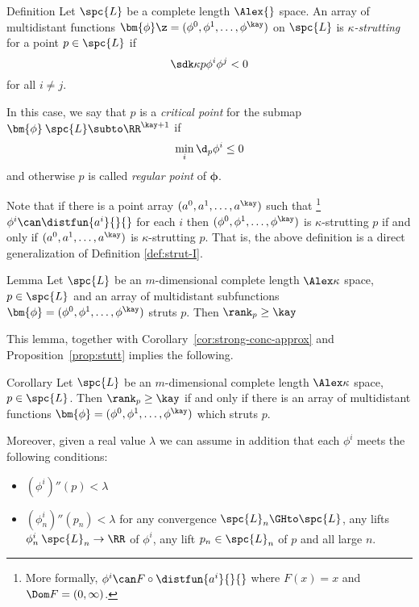 \begin{thm}{Definition}\label{def:strut-II}
Let $\spc{L}$ be a complete length $\Alex{}$ space.
An array of multidistant functions 
$\bm{\phi}\z=(\phi^0,\phi^1,\dots,\phi^\kay)$
on $\spc{L}$
is \emph{$\kappa$-strutting} for a point $p\in\spc{L}$ if 
\[\sdk\kappa{p}{\phi^i}{\phi^j}<0\]
for all $i\not=j$.

In this case, we say that $p$ is a 
\emph{critical point} 
for the submap $\bm{\phi}\:\spc{L}\subto \RR^{\kay+1}$
if
\[\min_i\d_p\phi^i\le 0\]
and otherwise $p$ is called 
\emph{regular point} of $\bm{\phi}$.
\end{thm} 

Note that if there is a point array $(a^0,a^1,\dots,a^\kay)$
such that%
\footnote{More formally, $\phi^i\can F\circ\distfun{a^i}{}{}$ where $F(x)=x$ and $\Dom F=(0,\infty)$.} $\phi^i\can\distfun{a^i}{}{}$ for each $i$
then $(\phi^0,\phi^1,\dots,\phi^\kay)$
is $\kappa$-strutting $p$
if and only if 
$(a^0,a^1,\dots,a^\kay)$ is $\kappa$-strutting $p$.
That is, the above definition is a direct generalization of Definition \ref{def:strut-I}.

\begin{thm}{Lemma}\label{lem:multi+rank}
Let $\spc{L}$ be an $m$-dimensional complete length $\Alex\kappa$ space, 
$p\in  \spc{L}$
and an array of multidistant subfunctions $\bm{\phi}=(\phi^0,\phi^1,\dots,\phi^\kay)$ struts $p$.
Then $\rank_p\ge \kay$
\end{thm}

This lemma, 
together with Corollary~\ref{cor:strong-conc-approx}
and Proposition~\ref{prop:stutt} implies the following.


\begin{thm}{Corollary}\label{cor:multi+rank}
Let $\spc{L}$ be an $m$-dimensional complete length $\Alex\kappa$ space, 
$p\in  \spc{L}$.
Then $\rank_p\ge \kay$
if and only if there is an array of multidistant functions $\bm{\phi}=(\phi^0,\phi^1,\dots,\phi^\kay)$ which struts $p$.

Moreover, given a real value $\lambda$
we can assume in addition that each $\phi^i$ meets the following conditions:
\begin{itemize}
\item $(\phi^i)''(p)< \lambda$
\item $(\phi_n^i)''(p_n)< \lambda$ for 
any convergence $\spc{L}_n\GHto\spc{L}$,
any lifts $\phi^i_n\:\spc{L}_n\to\RR$ of $\phi^i$,
any lift $p_n\in \spc{L}_n$ of $p$
and all large $n$.
\end{itemize}
\end{thm}

